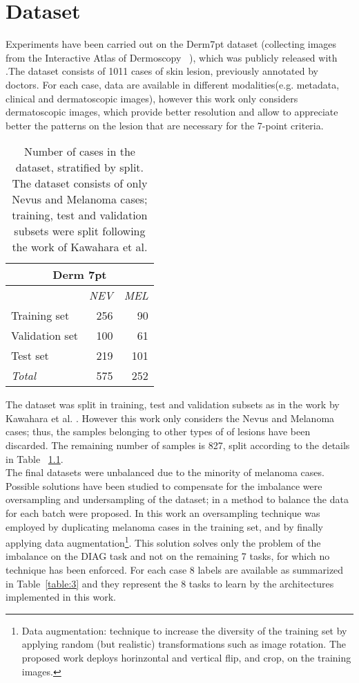 \graphicspath{{chapters/chapter3/}}
\chapter{Dataset} \label{chapter4}
Experiments have been carried out on the Derm7pt dataset (collecting images from the {Interactive Atlas of Dermoscopy}~\cite{Derm7ptData} ), which was publicly released with \cite{Kawahara}.The dataset consists of 1011 cases of skin lesion, previously annotated by doctors. For each case, data are available in different modalities(e.g. metadata, clinical and dermatoscopic images), however this work only considers dermatoscopic images, which provide better resolution and allow to appreciate better the patterns on the lesion that are necessary for the 7-point criteria.
\begin{table}[]
\centering
\begin{tabular}{|l|r|r|}
\hline
\multicolumn{3}{|c|}{\textbf{Derm 7pt}} \\ \hline
 & \multicolumn{1}{l|}{\textit{NEV}} & \multicolumn{1}{l|}{\textit{MEL}} \\ \hline
Training set & 256 & 90 \\ \hline
Validation set & 100 & 61 \\ \hline
Test set & 219 & 101 \\ \hline
\textit{Total} & 575 & 252 \\ \hline
\end{tabular}
\caption{Number of cases in the dataset, stratified by split. The dataset consists of only Nevus and Melanoma cases; training, test and validation subsets were split following the work of Kawahara et al.\cite{Kawahara} }
\label{table:dataset}
\end{table}

The dataset was split in training, test and validation subsets as in the work by Kawahara et al. \cite{Kawahara}. However this work only considers the Nevus and Melanoma cases; thus, the samples belonging to other types of of lesions have been discarded. The remaining number of samples is 827, split according to the details in Table ~\ref{table:dataset}.\\
The final datasets were unbalanced due to the minority of melanoma cases.
Possible solutions have been studied to compensate for the imbalance were oversampling and undersampling of the dataset; in \cite{mtl7ptCoppola,Kawahara} a method to balance the data for each batch were proposed. In this work an oversampling technique was employed by duplicating melanoma cases in the training set, and by finally applying data augmentation\footnote{Data augmentation: technique to increase the diversity of the training set by applying random (but realistic) transformations such as image rotation. The proposed work deploys horinzontal and vertical flip, and crop, on the training images.}.
This solution solves only the problem of the imbalance on the DIAG task and not on the remaining 7 tasks, for which no technique has been enforced.
For each case 8 labels are available as summarized in Table~\ref{table:3} and they represent the 8 tasks to learn by the architectures implemented in this work.




